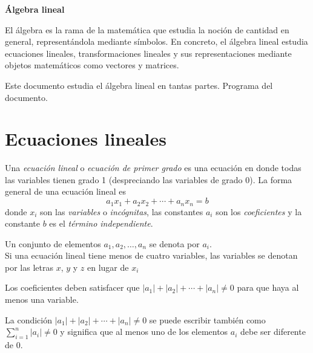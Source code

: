 \documentclass{fmbnotes}
\begin{document}


\newcommand*{\titulo}{Álgebra lineal}
\portada{\titulo} 


\begin{center}
{\Large\bfseries\sffamily \titulo}
\end{center}

\noindent El álgebra es la rama de la matemática que estudia la noción de cantidad en general, representándola mediante símbolos. En concreto, el álgebra lineal estudia ecuaciones lineales, transformaciones lineales y sus representaciones mediante objetos matemáticos como vectores y matrices.

Este documento estudia el álgebra lineal en \textcolor{green!50!black}{tantas partes. Programa del documento}.  

\section{Ecuaciones lineales}

Una \emph{ecuación lineal} o \emph{ecuación de primer grado} es una ecuación en donde todas las variables tienen grado 1 (despreciando las variables de grado 0). La forma general de una ecuación lineal es \[a_1x_1+a_2x_2+\cdots+a_nx_n=b\] donde \(x_i\) son las \emph{variables} o \emph{incógnitas}, las constantes \(a_i\) son los \emph{coeficientes} y la constante \(b\) es el \emph{término independiente}. 

\begin{notacion}
	Un conjunto de elementos \(a_1,a_2,\ldots,a_n\) se denota por \(a_i\). \\
	Si una ecuación lineal tiene menos de cuatro variables, las variables se denotan por las letras \(x\), \(y\) y \(z\) en lugar de \(x_i\)
\end{notacion}

Los coeficientes deben satisfacer que \(\left|a_1\right|+\left|a_2\right|+\cdots+\left|a_n\right|\neq0\) para que haya al menos una variable.

\begin{tip}
	La condición \(\left|a_1\right|+\left|a_2\right|+\cdots+\left|a_n\right|\neq0\) se puede escribir también como \(\sum_{i=1}^n \left|a_i\right|\neq0\) y significa que al menos uno de los elementos \(a_i\) debe ser diferente de 0.
\end{tip}
\end{document}
